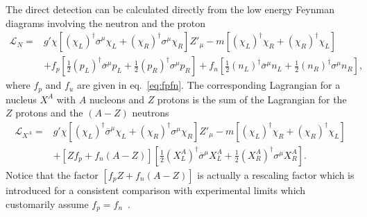 The direct detection can be calculated directly from the low energy Feynman diagrams involving the neutron and the proton
\begin{align}
  \mathcal{L}_N=&g'\chi \left[ \left( \chi_L \right)^{\dagger}  \overline{\sigma}^{\mu}\chi_L+\left( \chi_R \right)^{\dagger} {\sigma}^{\mu}  \chi_R \right]  Z'_{\mu}
           -m \left[\left( \chi_L \right)^{\dagger} \chi_R+
  \left( \chi_R \right)^{\dagger} \chi_L\right] \nonumber\\
  &+f_p\left[ \frac{1}{2}\left( p_L \right)^{\dagger}\overline{\sigma}^{\mu} p_L+\frac{1}{2}\left( p_R \right)^{\dagger}{\sigma}^{\mu} p_R  \right]
  +f_n\left[ \frac{1}{2}\left( n_L \right)^{\dagger}\overline{\sigma}^{\mu} n_L+\frac{1}{2}\left( n_R \right)^{\dagger}{\sigma}^{\mu} n_R  \right], 
\end{align}
where $f_p$ and $f_u$ are given in eq.~\eqref{eq:fpfn}.
The corresponding Lagrangian for a nucleus $X^A$ with $A$ nucleons and $Z$ protons is the sum of the Lagrangian for the $Z$ protons and the $(A-Z)$ neutrons
\begin{align}
  \mathcal{L}_{X^A}=&g'\chi \left[ \left( \chi_L \right)^{\dagger}  \overline{\sigma}^{\mu}\chi_L+\left( \chi_R \right)^{\dagger} {\sigma}^{\mu}  \chi_R \right]  Z'_{\mu}
           -m \left[\left( \chi_L \right)^{\dagger} \chi_R+
  \left( \chi_R \right)^{\dagger} \chi_L\right] \nonumber\\
  &+\left[ Z f_p + f_n(A-Z) \right]\left[ \frac{1}{2}\left( X^A_L \right)^{\dagger}\overline{\sigma}^{\mu} X^A_L+\frac{1}{2}\left( X^A_R \right)^{\dagger}{\sigma}^{\mu} X^A_R  \right].
\end{align}
Notice
that the factor
$\left[f_p Z + f_n (A-Z)\right]$
is actually a rescaling factor which is introduced for a
consistent comparison with experimental limits which customarily assume $f_p=f_n$~\cite{Arcadi:2017kky}.

